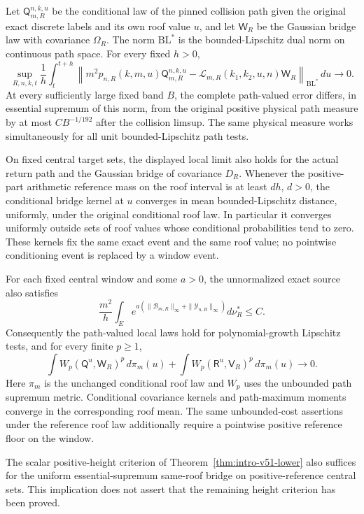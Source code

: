 \begin{leadtheorem}
\label{thm:intro-v52-path}
Let $\mathsf Q_{m,R}^{n,k,u}$ be the conditional law of the pinned
collision path given the original exact discrete labels and its own
roof value $u$, and let $\mathsf W_R$ be the Gaussian bridge law with
covariance $\Omega_R$. The norm $\mathrm{BL}^*$ is the bounded-Lipschitz
dual norm on continuous path space. For every fixed $h>0$,
\[
 \sup_{R,n,k,t}\frac1h\int_t^{t+h}
 \left\|m^2p_{n,R}(k,m,u)\mathsf Q_{m,R}^{n,k,u}
      -\mathcal L_{m,R}(k_1,k_2,u,n)\mathsf W_R\right\|_{\mathrm{BL}^*}
 \,du\longrightarrow0.
\]
At every sufficiently large fixed band $B$, the complete path-valued
error differs, in essential supremum of this norm, from the original
positive physical path measure by at most $CB^{-1/192}$ after the
collision limsup. The same physical measure works simultaneously for
all unit bounded-Lipschitz path tests.

On fixed central target sets, the displayed local limit also holds
for the actual return path and the Gaussian bridge of covariance
$D_R$. Whenever the positive-part arithmetic reference mass on the
roof interval is at least $dh$, $d>0$, the conditional bridge kernel
at $u$ converges in mean bounded-Lipschitz distance, uniformly, under
the original conditional roof law. In particular it converges uniformly
outside sets of roof values whose conditional probabilities tend to
zero. These kernels fix the same exact event and the same roof value;
no pointwise conditioning event is replaced by a window event.

For each fixed central window and some $a>0$, the unnormalized exact
source also satisfies
\[
 \frac{m^2}{h}\int_E
 e^{a(\|\mathcal B_{m,R}\|_\infty+\|\mathcal Y_{n,R}\|_\infty)}
                                                 d\nu_R^*\le C.
\]
Consequently the path-valued local laws hold for polynomial-growth
Lipschitz tests, and for every finite $p\ge1$,
\[
 \int W_p(\mathsf Q^u,\mathsf W_R)^p\,d\pi_m(u)
  +\int W_p(\mathsf R^u,\mathsf V_R)^p\,d\pi_m(u)\longrightarrow0.
\]
Here $\pi_m$ is the unchanged conditional roof law and $W_p$ uses the
unbounded path supremum metric. Conditional covariance kernels and
path-maximum moments converge in the corresponding roof mean. The
same unbounded-cost assertions under the reference roof law additionally
require a pointwise positive reference floor on the window.

The scalar positive-height criterion of Theorem~\ref{thm:intro-v51-lower}
also suffices for the uniform essential-supremum same-roof bridge on
positive-reference central sets. This implication does not assert that
the remaining height criterion has been proved.
\end{leadtheorem}
